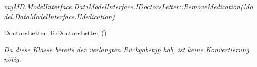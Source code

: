 \begin{CompactItemize}
\begin{CompactList}\small\item\em \hyperlink{interfacemy_m_d_1_1_model_interface_1_1_data_model_interface_1_1_i_doctors_letter_21bff2bea1b5f08bc7e79dd65b9ccf16}{my\-MD.Model\-Interface.Data\-Model\-Interface.IDoctors\-Letter::Remove\-Medication}(Model.Data\-Model\-Interface.IMedication) \item\end{CompactList}\item 
\hyperlink{classmy_m_d_1_1_model_1_1_data_model_1_1_doctors_letter}{Doctors\-Letter} \hyperlink{classmy_m_d_1_1_model_1_1_data_model_1_1_doctors_letter_a52c06afbc0038d351f09b083e586b2e}{To\-Doctors\-Letter} ()
\begin{CompactList}\small\item\em Da diese Klasse bereits den verlangten R\"{u}ckgabetyp hab, ist keine Konvertierung n\"{o}tig. \item\end{CompactList}\end{CompactItemize}
